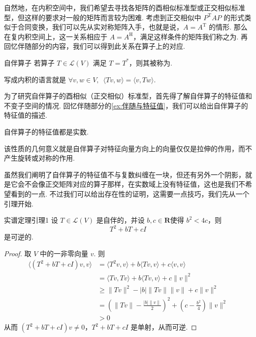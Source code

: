 自然地，在内积空间中，我们希望去寻找各矩阵的酉相似标准型或正交相似标准型，但这样的要求对一般的矩阵而言较为困难. 考虑到正交相似中 $ P^{\mathrm{T}}AP $ 的形式类似于合同变换，我们可以先从实对称矩阵入手，也就是说，$ A = A^{\mathrm{T}} $ 的情形. 那么在复内积空间上，这一关系相应于 $ A = A^{\mathrm{H}} $，满足这样条件的矩阵我们称之为. 再回忆伴随部分的内容，我们可以得到此关系在算子上的对应.

\begin{definition}{自伴算子}{} 
    若算子 $ T \in \mathcal{L}(V) $ 满足 $ T = T^* $，则其被称为.
\end{definition}

写成内积的语言就是 $ \forall v, w \in V,\enspace \langle Tv, w \rangle = \langle v, Tw \rangle $.

为了研究自伴算子的酉相似（正交相似）标准型，首先得了解自伴算子的特征值和不变子空间的情况. 回忆伴随部分的\autoref{ex:伴随与特征值}，我们可以给出自伴算子的特征值的描述.

\begin{theorem}{}{}
    自伴算子的特征值都是实数.
\end{theorem}

该性质的几何意义就是自伴算子对特征向量方向上的向量仅仅是拉伸的作用，而不产生旋转或对称的作用.

虽然我们阐明了自伴算子的特征值不与复数纠缠在一块，但还有另外一个阴影，就是它会不会像正交矩阵对应的算子那样，在实数域上没有特征值，这也是我们不希望看到的一点. 不过我们可以给出存在性的证明，这需要一点技巧，我们先从一个引理开始.

\begin{lemma}{}{实谱定理引理1}
    设 $ T \in \mathcal{L}(V) $ 是自伴的，并设 $ b, c \in \mathbf{R} $使得 $ b^2 < 4c $，则
    \[ T^2 + bT + cI \]
    是可逆的.
\end{lemma}

\begin{proof}
    取 $ V $ 中的一非零向量 $ v $. 则
    \begin{align*}
        \langle(T^2+bT+cI)v,v\rangle & = \langle T^2v,v \rangle + b\langle Tv,v \rangle + c\langle v,v \rangle                                  \\
                                     & = \langle Tv,Tv \rangle + b\langle Tv,v \rangle + c\lVert v \rVert^2                                     \\
                                     & \geqslant \lVert Tv \rVert^2 - \lvert b \rvert \lVert Tv \rVert \lVert v \rVert +  c\lVert v \rVert^2    \\
                                     & = \left(\lVert Tv \rVert - \frac{|b| \lVert v \rVert}{2}\right)^2 + (c - \frac{b^2}{4})\lVert v \rVert^2 \\
                                     & > 0
    \end{align*}
    从而 $ (T^2 + bT + cI)v \neq 0 $，$ T^2 + bT + cI $ 是单射，从而可逆.
\end{proof}

